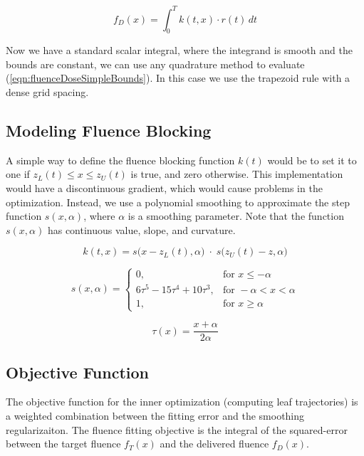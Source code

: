 \begin{equation}
  f_D(x) = \int_0^T \! k(t, x) \cdot r(t) \, dt
  \label{eqn:fluenceDoseSimpleBounds}
\end{equation}

Now we have a standard scalar integral, where the integrand is smooth and the
bounds are constant, we can use any quadrature method to evaluate (\ref{eqn:fluenceDoseSimpleBounds}).
In this case we use the trapezoid rule with a dense grid spacing.

\subsection{Modeling Fluence Blocking}
\label{sec:modelingFluenceBlocking}

A simple way to define the fluence blocking function $k(t)$
would be to set it to one if $z_L(t) \leq x \leq z_U(t)$
is true, and zero otherwise.
This implementation would have a discontinuous gradient, which would cause problems in the optimization.
Instead, we use a polynomial smoothing to approximate the step function $s(x,\alpha)$,
where $\alpha$ is a smoothing parameter.
Note that the function $s(x,\alpha)$ has continuous value, slope, and curvature.

\begin{equation}
  k(t, x) = s\big(x - z_L(t), \alpha\big) \; \cdot \; s\big(z_U(t) - z, \alpha\big)
\end{equation}

\begin{equation}
  s(x, \alpha) =
    \begin{cases}
      0, & \text{for } x \leq -\alpha \\
      6\tau^5-15\tau^4+10\tau^3, & \text{for }  -\alpha < x < \alpha\\
      1, & \text{for } x \geq \alpha
    \end{cases}
\end{equation}

\begin{equation}
  \tau(x) = \frac{x + \alpha}{2\alpha}
\end{equation}

\subsection{Objective Function}

The objective function for the inner optimization (computing leaf trajectories)
is a weighted combination between the fitting error and the smoothing regularizaiton.
The fluence fitting objective is the integral of the squared-error
between the target fluence $f_T(x)$ and the delivered fluence $f_D(x)$.

